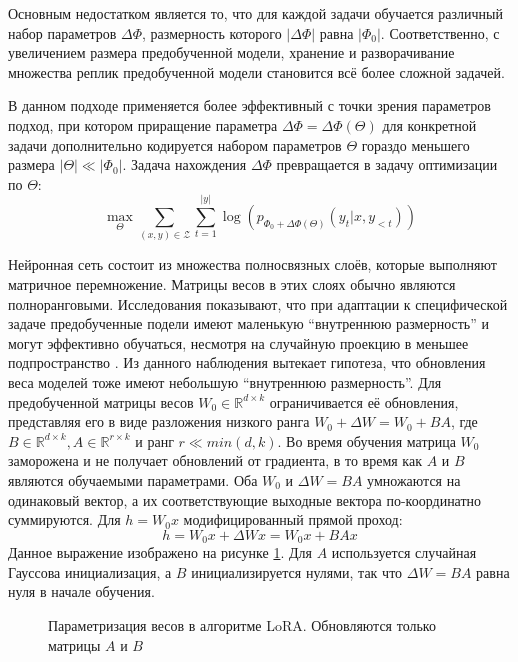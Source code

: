 Основным недостатком является то, что для каждой задачи обучается различный набор параметров $\Delta\Phi$, размерность которого $|\Delta\Phi|$ равна $|\Phi_0|$.
Соответственно, с увеличением размера предобученной модели, хранение и разворачивание множества реплик предобученной модели становится всё более сложной задачей.

В данном подходе применяется более эффективный с точки зрения параметров подход, при котором приращение параметра $\Delta\Phi = \Delta\Phi(\Theta)$ для конкретной задачи дополнительно кодируется набором параметров $\Theta$ гораздо меньшего размера $|\Theta| \ll |\Phi_0|$.
Задача нахождения $\Delta\Phi$ превращается в задачу оптимизации по $\Theta$:
$$
\max_\Theta
\sum_{(x,y)\in \mathcal{Z}}
\sum_{t=1}^{|y|}
\log(p_{\Phi_0 + \Delta\Phi(\Theta)}(y_t|x,y_{<t}))
$$

Нейронная сеть состоит из множества полносвязных слоёв, которые выполняют матричное перемножение.
Матрицы весов в этих слоях обычно являются полноранговыми.
Исследования показывают, что при адаптации к специфической задаче предобученные подели имеют маленькую "`внутреннюю размерность"' и могут эффективно обучаться, несмотря на случайную проекцию в меньшее подпространство \cite{aghajanyan2020intrinsic}.
Из данного наблюдения вытекает гипотеза, что обновления веса моделей тоже имеют небольшую "`внутреннюю размерность"'.
Для предобученной матрицы весов $W_0 \in \mathbb{R}^{d \times k}$ ограничивается её обновления, представляя его в виде разложения низкого ранга $W_0+\Delta W = W_0 + BA$, где $B \in \mathbb{R}^{d \times k}, A\in \mathbb{R}^{r \times k}$ и ранг $r \ll min(d,k)$.
Во время обучения матрица $W_0$ заморожена и не получает обновлений от градиента, в то время как $A$ и $B$ являются обучаемыми параметрами.
Оба $W_0$ и $\Delta W = BA$ умножаются на одинаковый вектор, а их соответствующие выходные вектора по-координатно суммируются.
Для $h = W_0 x$ модифицированный прямой проход:
$$h = W_0x + \Delta W x = W_0x + BAx$$
Данное выражение изображено на рисунке \ref{fig:lora}.
Для $A$ используется случайная Гауссова инициализация, а $B$ инициализируется нулями, так что $\Delta W = BA$ равна нуля в начале обучения.

\begin{figure}[ht]
  \centering
  \caption{Параметризация весов в алгоритме LoRA. Обновляются только матрицы $A$ и $B$}
  \label{fig:lora}
\end{figure}

